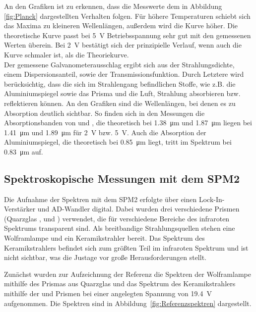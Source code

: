 \documentclass[a4paper,twoside,final]{article}
\begin{document}
\FloatBarrier
An den Grafiken ist zu erkennen, dass die Messwerte dem in Abbildung \ref{fig:Planck} dargestellten Verhalten folgen. Für höhere Temperaturen schiebt sich das Maxima zu kleineren Wellenlängen, außerdem wird die Kurve höher. Die theoretische Kurve passt bei \SI{5}{\volt} Betriebsspannung sehr gut mit den gemessenen Werten überein. Bei \SI{2}{\volt} bestätigt sich der prinzipielle Verlauf, wenn auch die Kurve schmaler ist, als die Theoriekurve.\\
Der gemessene Galvanometerausschlag ergibt sich aus der Strahlungsdichte, einem Dispersionsanteil, sowie der Transmissionsfunktion. Durch Letztere wird berücksichtig, dass die sich im Strahlengang befindlichen Stoffe, wie z.B. die Aluminiumspiegel sowie das Prisma und die Luft, Strahlung absorbieren bzw. reflektieren können. An den Grafiken sind die Wellenlängen, bei denen es zu Absorption deutlich sichtbar. So finden sich in den Messungen die Absorptionsbanden von  und , die theoretisch bei \SI{1.38}{\micro\meter} und \SI{1.87}{\micro\meter} liegen bei \SI{1.41}{\micro\meter} und \SI{1.89}{\micro\meter} für \SI{2}{\volt} bzw. \SI{5}{\volt}. Auch die Absorption der Aluminiumspiegel, die theoretisch bei \SI{0.85}{\micro\meter} liegt, tritt im Spektrum bei \SI{0.83}{\micro\meter} auf.

\subsection{Spektroskopische Messungen mit dem SPM2}

Die Aufnahme der Spektren mit dem SPM2 erfolgte über einen Lock-In-Verstärker und AD-Wandler digital. Dabei wurden drei verschiedene Prismen (Quarzglas ,  und ) verwendet, die für verschiedene Bereiche des infraroten Spektrums transparent sind. Als breitbandige Strahlungsquellen stehen eine Wolframlampe und ein Keramikstrahler bereit. Das Spektrum des Keramikstrahlers befindet sich zum größten Teil im infraroten Spektrum und ist nicht sichtbar, was die Justage vor große Herausforderungen stellt.

Zunächst wurden zur Aufzeichnung der Referenz die Spektren der Wolframlampe mithilfe des Prismas aus Quarzglas und das Spektrum des Keramikstrahlers mithilfe der  und  Prismen bei einer angelegten Spannung von \SI{19.4}{\volt} aufgenommen. Die Spektren sind in Abbildung~\ref{fig:Referenzspektren} dargestellt.


\end{document}
